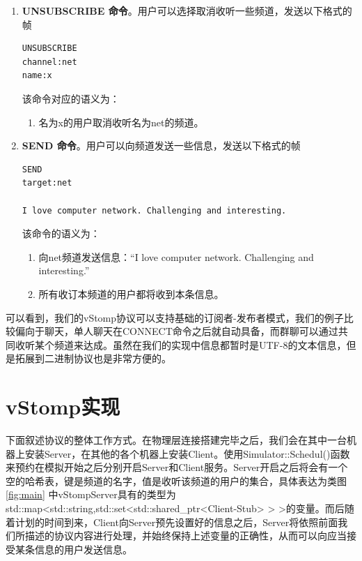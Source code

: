 \documentclass{ctexrep}
\begin{document}
\begin{enumerate}
\begin{enumerate}
		\end{enumerate}
		\item \textbf{UNSUBSCRIBE 命令}。用户可以选择取消收听一些频道，发送以下格式的帧\begin{lstlisting}
UNSUBSCRIBE
channel:net
name:x
		\end{lstlisting}该命令对应的语义为：\begin{enumerate}
			\item 名为x的用户取消收听名为net的频道。
		\end{enumerate}
		\item \textbf{SEND 命令}。用户可以向频道发送一些信息，发送以下格式的帧\begin{lstlisting}
SEND
target:net

I love computer network. Challenging and interesting.
		\end{lstlisting}该命令的语义为：\begin{enumerate}
			\item 向net频道发送信息：“I love computer network. Challenging and interesting.”
			\item 所有收订本频道的用户都将收到本条信息。
		\end{enumerate}
	\end{enumerate}

可以看到，我们的vStomp协议可以支持基础的订阅者-发布者模式，我们的例子比较偏向于聊天，单人聊天在CONNECT命令之后就自动具备，而群聊可以通过共同收听某个频道来达成。虽然在我们的实现中信息都暂时是UTF-8的文本信息，但是拓展到二进制协议也是非常方便的。
	\chapter{vStomp实现}
	下面叙述协议的整体工作方式。在物理层连接搭建完毕之后，我们会在其中一台机器上安装Server，在其他的各个机器上安装Client。使用Simulator::Schedul()函数来预约在模拟开始之后分别开启Server和Client服务。Server开启之后将会有一个空的哈希表，键是频道的名字，值是收听该频道的用户的集合，具体表达为类图 \ref{fig:main} 中vStompServer具有的类型为std::map<std::string,std::set<std::shared\_ptr<Client-Stub> > >的变量。而后随着计划的时间到来，Client向Server预先设置好的信息之后，Server将依照前面我们所描述的协议内容进行处理，并始终保持上述变量的正确性，从而可以向应当接受某条信息的用户发送信息。 
	
\end{document}
